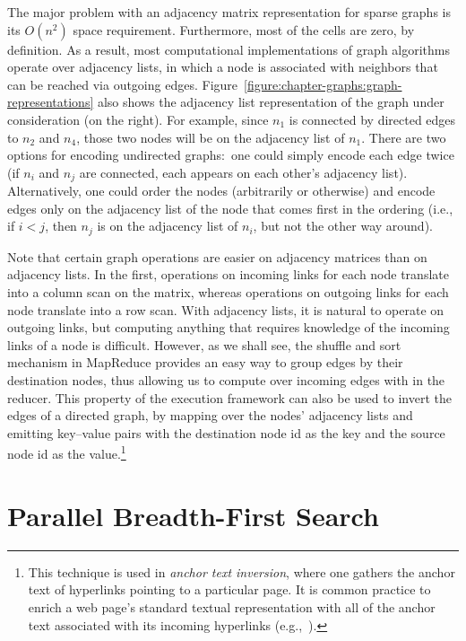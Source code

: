 The major problem with an adjacency matrix representation for sparse
graphs is its $O(n^2)$ space requirement.  Furthermore, most of the
cells are zero, by definition.  As a result, most computational
implementations of graph algorithms operate over adjacency lists, in
which a node is associated with neighbors that can be reached via
outgoing edges.
Figure~\ref{figure:chapter-graphs:graph-representations} also shows
the adjacency list representation of the graph under consideration (on
the right).  For example, since $n_1$ is connected by directed edges
to $n_2$ and $n_4$, those two nodes will be on the adjacency list of
$n_1$.  There are two options for encoding undirected graphs:\ one
could simply encode each edge twice (if $n_i$ and $n_j$ are connected,
each appears on each other's adjacency list).  Alternatively, one
could order the nodes (arbitrarily or otherwise) and encode edges only
on the adjacency list of the node that comes first in the ordering
(i.e., if $i<j$, then $n_j$ is on the adjacency list of $n_i$, but not
the other way around).

Note that certain graph operations are easier on adjacency matrices
than on adjacency lists.  In the first, operations on incoming links
for each node translate into a column scan on the matrix, whereas
operations on outgoing links for each node translate into a row scan.
With adjacency lists, it is natural to operate on outgoing links, but
computing anything that requires knowledge of the incoming links of a
node is difficult.  However, as we shall see, the shuffle and sort
mechanism in MapReduce provides an easy way to group edges by their
destination nodes, thus allowing us to compute over incoming edges
with in the reducer.  This property of the execution framework can
also be used to invert the edges of a directed graph, by mapping over
the nodes' adjacency lists and emitting key--value pairs with the
destination node id as the key and the source node id as the
value.\footnote{This technique is used in {\it anchor text inversion},
  where one gathers the anchor text of hyperlinks pointing to a
  particular page.  It is common practice to enrich a web page's
  standard textual representation with all of the anchor text
  associated with its incoming hyperlinks
  (e.g.,~\cite{Metzler_etal_2009}).}

\section{Parallel Breadth-First Search}
\label{chapter-graphs:BFS}

